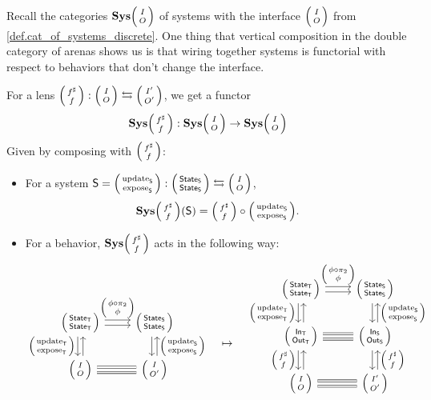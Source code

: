 \documentclass[DynamicalBook]{subfiles}
\begin{document}
Recall the categories $\Cat{Sys}\lens{I}{O}$ of systems with the interface
$\lens{I}{O}$ from
\cref{def.cat_of_systems_discrete}. One thing that vertical composition in the
double category of arenas shows us is that wiring together systems is functorial
with respect to behaviors that don't change the interface.
\begin{proposition}\label{prop.lens_comp_functor_discrete}
  For a lens $\lens{f^{\sharp}}{f} : \lens{I}{O} \leftrightarrows
  \lens{I'}{O'}$, we get a functor
  $$\Cat{Sys}\lens{f^\sharp}{f} : \Cat{Sys}\lens{I}{O} \to
  \Cat{Sys}\lens{I}{O}$$
  Given by composing with $\lens{f^\sharp}{f}$:
  \begin{itemize}
    \item For a system $\Sys{S} = \lens{\update{S}}{\expose{S}} :
      \lens{\State{S}}{\State{S}}\fromto \lens{I}{O}$,
      $$\Cat{Sys}\lens{f^{\sharp}}{f}(\Sys{S}) = \lens{f^{\sharp}}{f} \circ \lens{\update{S}}{\expose{S}}.$$
    \item For a behavior, $\Cat{Sys}\lens{f^{\sharp}}{f}$ acts in the following way:
      \[
  \begin{tikzcd}
    \lens{\State{T}}{\State{T}} \ar[r, shift left, "\lens{\phi \circ
      \pi_2}{\phi}"] \ar[r, shift right] \ar[d, shift right,
    "\lens{\update{T}}{\expose{T}}"'] \ar[d, shift left, leftarrow] &
    \lens{\State{S}}{\State{S}} \ar[d, shift left, leftarrow,
    "\lens{\update{S}}{\expose{S}}"] \ar[d, shift right]\\
    \lens{I}{O} \ar[r, shift right, equals]
    \ar[r, shift left, equals] & \lens{I}{O'}
  \end{tikzcd} \quad \mapsto \quad
  \begin{tikzcd}
    \lens{\State{T}}{\State{T}} \ar[r, shift left, "\lens{\phi \circ
      \pi_2}{\phi}"] \ar[r, shift right] \ar[d, shift right,
    "\lens{\update{T}}{\expose{T}}"'] \ar[d, shift left, leftarrow] &
    \lens{\State{S}}{\State{S}} \ar[d, shift left, leftarrow,
    "\lens{\update{S}}{\expose{S}}"] \ar[d, shift right]\\
    \lens{\In{T}}{\Out{T}} \ar[d, shift right, "\lens{f^{\sharp}}{f}"'] \ar[d, shift left,
        leftarrow] \ar[r, shift right, equals]
    \ar[r, shift left, equals] & \lens{\In{S}}{\Out{S}} \ar[d, shift left, leftarrow,
        "\lens{f^{\sharp}}{f}"] \ar[d, shift right]\\
    \lens{I}{O} \ar[r, shift right, equals]
    \ar[r, shift left, equals] & \lens{I'}{O'} \\
  \end{tikzcd} 
      \]
  \end{itemize}
\end{proposition}
\end{document}
